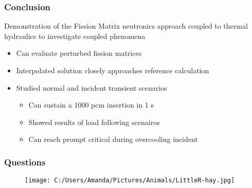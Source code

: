 \begin{frame}
  \frametitle{Conclusion}
        Demonstration of the Fission Matrix neutronics approach coupled 
        to thermal hydraulics to investigate coupled phenomena
        \begin{itemize}
                \item Can evaluate perturbed fission matrices
                \item Interpolated solution closely approaches reference calculation
                \item Studied normal and incident transient scenarios
                \begin{itemize}
                        \item Can sustain a 1000 pcm insertion in 1 s 
                        \item Showed results of load following scenairos 
                        \item Can reach prompt critical during overcooling incident
                \end{itemize}
        \end{itemize}
\end{frame}

\begin{frame}
  \frametitle{Questions}
  \begin{figure}
        \centering
        \texttt{[image: C:/Users/Amanda/Pictures/Animals/LittleR-hay.jpg]}
  \end{figure}
\end{frame}
